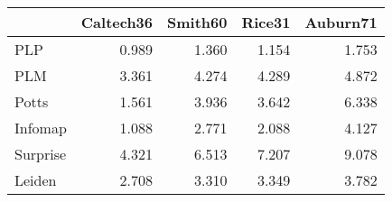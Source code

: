 \begin{tabular}{lrrrr}
\toprule
{} & Caltech36 & Smith60 & Rice31 & Auburn71 \\
\midrule
PLP      &     0.989 &   1.360 &  1.154 &    1.753 \\
PLM      &     3.361 &   4.274 &  4.289 &    4.872 \\
Potts    &     1.561 &   3.936 &  3.642 &    6.338 \\
Infomap  &     1.088 &   2.771 &  2.088 &    4.127 \\
Surprise &     4.321 &   6.513 &  7.207 &    9.078 \\
Leiden   &     2.708 &   3.310 &  3.349 &    3.782 \\
\bottomrule
\end{tabular}
